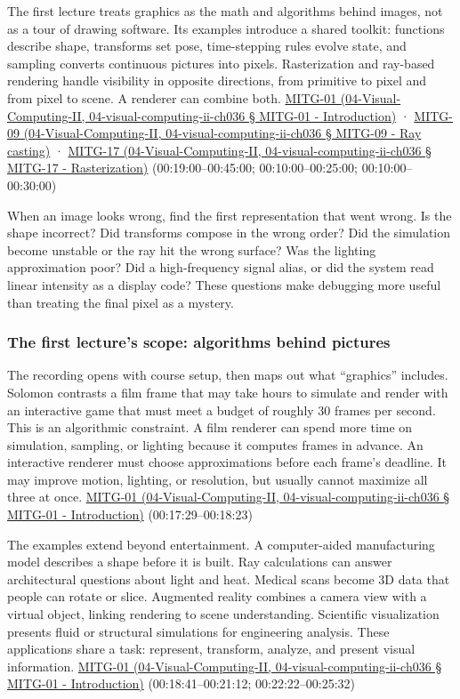 The first lecture treats graphics as the math and algorithms behind images, not as a tour of drawing software. Its examples introduce a shared toolkit: functions describe shape, transforms set pose, time-stepping rules evolve state, and sampling converts continuous pictures into pixels. Rasterization and ray-based rendering handle visibility in opposite directions, from primitive to pixel and from pixel to scene. A renderer can combine both. \href{}{MITG-01 (04-Visual-Computing-II, 04-visual-computing-ii-ch036 § MITG-01 - Introduction)} · \href{}{MITG-09 (04-Visual-Computing-II, 04-visual-computing-ii-ch036 § MITG-09 - Ray casting)} · \href{}{MITG-17 (04-Visual-Computing-II, 04-visual-computing-ii-ch036 § MITG-17 - Rasterization)} (00:19:00--00:45:00; 00:10:00--00:25:00; 00:10:00--00:30:00)

When an image looks wrong, find the first representation that went wrong. Is the shape incorrect? Did transforms compose in the wrong order? Did the simulation become unstable or the ray hit the wrong surface? Was the lighting approximation poor? Did a high-frequency signal alias, or did the system read linear intensity as a display code? These questions make debugging more useful than treating the final pixel as a mystery.

\subsubsection{The first lecture's scope: algorithms behind pictures}\label{the-first-lectures-scope-algorithms-behind-pictures}

The recording opens with course setup, then maps out what ``graphics'' includes. Solomon contrasts a film frame that may take hours to simulate and render with an interactive game that must meet a budget of roughly 30 frames per second. This is an algorithmic constraint. A film renderer can spend more time on simulation, sampling, or lighting because it computes frames in advance. An interactive renderer must choose approximations before each frame's deadline. It may improve motion, lighting, or resolution, but usually cannot maximize all three at once. \href{}{MITG-01 (04-Visual-Computing-II, 04-visual-computing-ii-ch036 § MITG-01 - Introduction)} (00:17:29--00:18:23)

The examples extend beyond entertainment. A computer-aided manufacturing model describes a shape before it is built. Ray calculations can answer architectural questions about light and heat. Medical scans become 3D data that people can rotate or slice. Augmented reality combines a camera view with a virtual object, linking rendering to scene understanding. Scientific visualization presents fluid or structural simulations for engineering analysis. These applications share a task: represent, transform, analyze, and present visual information. \href{}{MITG-01 (04-Visual-Computing-II, 04-visual-computing-ii-ch036 § MITG-01 - Introduction)} (00:18:41--00:21:12; 00:22:22--00:25:32)

